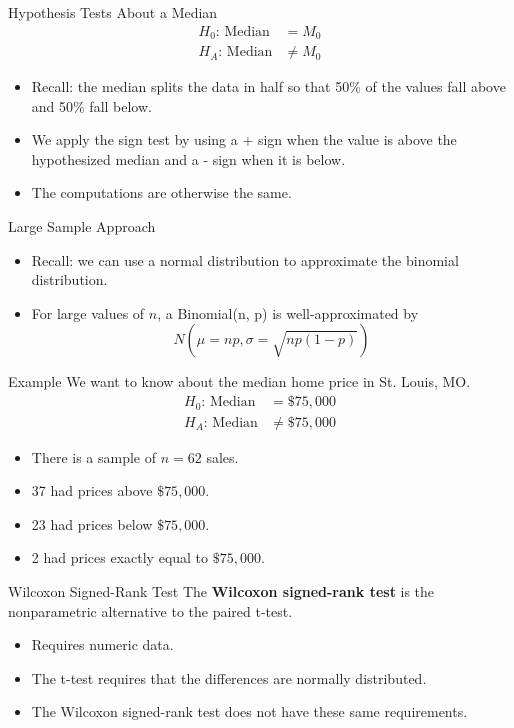 \begin{frame}{Hypothesis Tests About a Median}
    \begin{align*}
        H_0\text{: Median}&=M_0 \\
        H_A\text{: Median}&\ne M_0
    \end{align*}
    \begin{itemize}
        \item Recall: the median splits the data in half so that 50\% of the values fall above and 50\% fall below.
        \item We apply the sign test by using a + sign when the value is above the hypothesized median and a - sign when it is below. 
        \item The computations are otherwise the same.
    \end{itemize}
\end{frame}

\begin{frame}{Large Sample Approach}
    \begin{itemize}
        \item Recall: we can use a normal distribution to approximate the binomial distribution.
        \item For large values of $n$, a Binomial(n, p) is well-approximated by
        \[
            N(\mu = np, \sigma=\sqrt{np(1-p)})
        \]
    \end{itemize}
\end{frame}

\begin{frame}{Example}
    We want to know about the median home price in St. Louis, MO.
    \begin{align*}
        H_0\text{: Median}&=\$75,000 \\
        H_A\text{: Median}&\ne \$75,000
    \end{align*}
    \begin{itemize}
        \item There is a sample of $n=62$ sales.
        \item 37 had prices above $\$75,000$.
        \item 23 had prices below $\$75,000$.
        \item 2 had prices exactly equal to $\$75,000$.
    \end{itemize}
\end{frame}

\begin{frame}{Wilcoxon Signed-Rank Test}
    The \textbf{Wilcoxon signed-rank test} is the nonparametric alternative to the paired t-test.
    \begin{itemize}
        \item Requires numeric data.
        \item The t-test requires that the differences are normally distributed.
        \item The Wilcoxon signed-rank test does not have these same requirements. 
    \end{itemize}
\end{frame}

